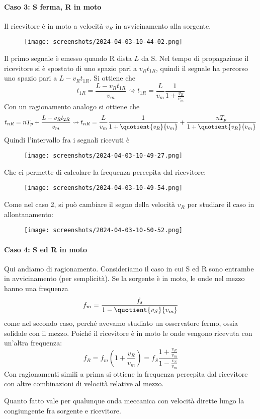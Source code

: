 \paragraph{Caso 3: S ferma, R in moto} Il ricevitore è in moto a velocità \(v_R\) in avvicinamento alla sorgente.
\begin{figure}[H]
	\centering
	\texttt{[image: screenshots/2024-04-03-10-44-02.png]}
\end{figure}
Il primo segnale è emesso quando R dista \(L\) da S. Nel tempo di propagazione il ricevitore si è spostato di uno spazio pari a \(v_R t_{1R} \), quindi il segnale ha percorso uno spazio pari a \(L- v_R t_{1R} \). Si ottiene che
\[
	t_{1R} = \frac{L- v_R t_{1R} }{v_m} \rightsquigarrow t_{1R} = \frac{L}{v_m} \frac{1}{1+ \frac{v_R}{v_m}}
\]
Con un ragionamento analogo si ottiene che 
\[
	t_{nR}  = n T_p + \frac{L-v_R t_{2R} }{v_m} \rightsquigarrow t_{nR} = \frac{L}{v_m} \frac{1}{1 + \quotient{v_R}{v_m}} + \frac{n T_p}{1+ \quotient{v_R}{v_m} }
\]
Quindi l'intervallo fra i segnali ricevuti è
\begin{figure}[H]
	\centering
	\texttt{[image: screenshots/2024-04-03-10-49-27.png]}
\end{figure}
Che ci permette di calcolare la frequenza percepita dal ricevitore:
\begin{figure}[H]
	\centering
	\texttt{[image: screenshots/2024-04-03-10-49-54.png]}
\end{figure}
Come nel caso 2, si può cambiare il segno della velocità \(v_R\) per studiare il caso in allontanamento:
\begin{figure}[H]
	\centering
	\texttt{[image: screenshots/2024-04-03-10-50-52.png]}
\end{figure}

\paragraph{Caso 4: S ed R in moto} Qui andiamo di ragionamento. Consideriamo il caso in cui S ed R sono entrambe in avvicinamento (per semplicità). Se la sorgente è in moto, le onde nel mezzo hanno una frequenza 
\[
	f_m = \frac{f_s}{1 - \quotient{v_S}{v_m} }
\]
come nel secondo caso, perché avevamo studiato un osservatore fermo, ossia solidale con il mezzo. Poiché il ricevitore è in moto le onde vengono ricevuta con un'altra frequenza:
\[
	f_R = f_m \left( 1+ \frac{v_R}{v_m} \right) = f_S \frac{1+ \frac{v_R}{v_m}}{1- \frac{v_S}{v_m}}
\]
Con ragionamenti simili a prima si ottiene la frequenza percepita dal ricevitore con altre combinazioni di velocità relative al mezzo.
\begin{note}
	Quanto fatto vale per qualunque onda meccanica con velocità dirette lungo la congiungente fra sorgente e ricevitore.
\end{note}